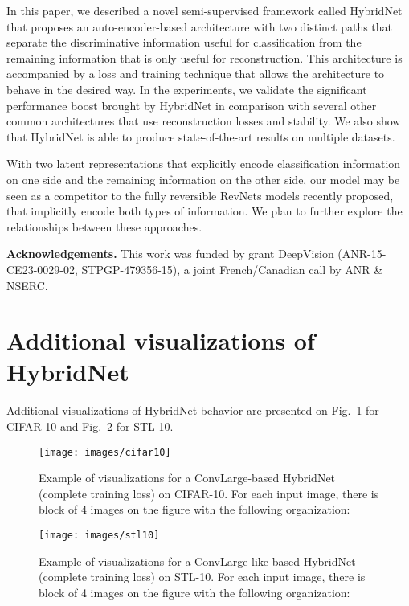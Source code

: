 \documentclass[runningheads]{llncs}
\begin{document}
In this paper, we described a novel semi-supervised framework called HybridNet that proposes an auto-encoder-based architecture with two distinct paths that  separate the discriminative information useful for classification from the remaining information that is only useful for reconstruction. This architecture is accompanied by a loss and training technique that allows the architecture to behave in the desired way. In the experiments, we validate the significant performance boost brought by HybridNet in comparison with several other common architectures that use reconstruction losses and stability. We also show that HybridNet is able to produce state-of-the-art results on multiple datasets.

With two latent representations that explicitly encode classification information on one side and the remaining information on the other side, our model may be seen as a competitor to the fully reversible RevNets models recently proposed, that implicitly encode both types of information.
We plan to further explore the relationships between these approaches.

\textbf{Acknowledgements.} This work was funded by grant DeepVision (ANR-15-CE23-0029-02, STPGP-479356-15), a joint French/Canadian call by ANR \& NSERC.





\newpage
\appendix


\section{Additional visualizations of HybridNet}

Additional visualizations of HybridNet behavior are presented on Fig.~\ref{fig:cifar10} for CIFAR-10 and Fig.~\ref{fig:stl10} for STL-10.

\begin{figure}
	\centering
    \texttt{[image: images/cifar10]}
    \caption[]{Example of visualizations for a ConvLarge-based HybridNet (complete training loss) on CIFAR-10. For each input image, there is block of 4 images on the figure with the following organization: }
    \label{fig:cifar10}
\end{figure}

\begin{figure}
	\centering
    \texttt{[image: images/stl10]}
    \caption[]{Example of visualizations for a ConvLarge-like-based HybridNet (complete training loss) on STL-10. For each input image, there is block of 4 images on the figure with the following organization: }
    \label{fig:stl10}
\end{figure}
\end{document}
